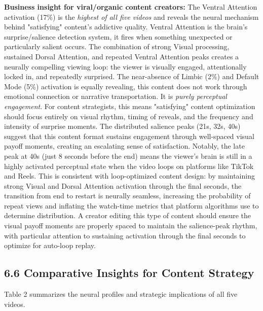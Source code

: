 \documentclass[11pt,letterpaper]{article}
\begin{document}
\textbf{Business insight for viral/organic content creators:} The Ventral Attention activation (17\%) is the \textit{highest of all five videos} and reveals the neural mechanism behind "satisfying" content's addictive quality. Ventral Attention is the brain's surprise/salience detection system, it fires when something unexpected or particularly salient occurs. The combination of strong Visual processing, sustained Dorsal Attention, and repeated Ventral Attention peaks creates a neurally compelling viewing loop: the viewer is visually engaged, attentionally locked in, and repeatedly surprised. The near-absence of Limbic (2\%) and Default Mode (5\%) activation is equally revealing, this content does not work through emotional connection or narrative transportation. It is \textit{purely perceptual engagement}. For content strategists, this means "satisfying" content optimization should focus entirely on visual rhythm, timing of reveals, and the frequency and intensity of surprise moments. The distributed salience peaks (21s, 32s, 40s) suggest that this content format sustains engagement through well-spaced visual payoff moments, creating an escalating sense of satisfaction. Notably, the late peak at 40s (just 8 seconds before the end) means the viewer's brain is still in a highly activated perceptual state when the video loops on platforms like TikTok and Reels. This is consistent with loop-optimized content design: by maintaining strong Visual and Dorsal Attention activation through the final seconds, the transition from end to restart is neurally seamless, increasing the probability of repeat views and inflating the watch-time metrics that platform algorithms use to determine distribution. A creator editing this type of content should ensure the visual payoff moments are properly spaced to maintain the salience-peak rhythm, with particular attention to sustaining activation through the final seconds to optimize for auto-loop replay.

\subsection{6.6 Comparative Insights for Content Strategy}

Table 2 summarizes the neural profiles and strategic implications of all five videos.
\end{document}
